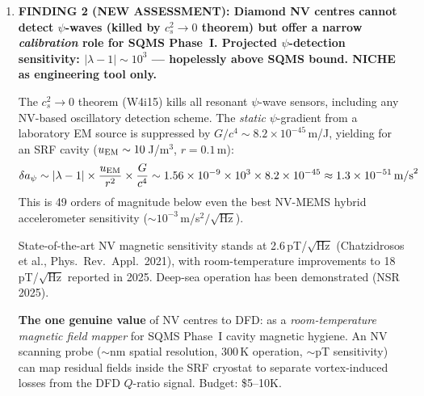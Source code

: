 \documentclass[11pt]{article}
\theoremstyle{definition}
\theoremstyle{remark}
\newcommand{\ee}[1]{\times 10^{#1}}
\newcommand{\Meff}{M_{\rm eff}}
\newcommand{\killed}[1]{\textcolor{red!70!black}{\textbf{KILLED:} #1}}
\begin{document}
\begin{tcolorbox}[colback=blue!5!white, colframe=blue!50!black,
  title=\textbf{W4i16 TOP 5 FINDINGS --- Ranked by Programme Impact}]
\begin{enumerate}
\textbf{(b) Experimental $Q$ gap.} The highest demonstrated graphene
resonator $Q$ at cryogenic temperatures is $\sim 2.5\ee{5}$ (graphene/hBN
heterostructure at $< 10$\,K; Bachtold group, Nano Lett.\ 2017). Arrays
of bare graphene drumheads achieve only $Q \sim 100$--$2400$ at room
temperature (Bunch et al., Nano Lett.\ 2011). No graphene PnC membrane
has been fabricated to date --- the theoretical predictions of $Q \sim
10^{8}$--$10^{9}$ remain entirely unrealised.

\killed{Graphene MEMS for DFD. Both the $\Meff$ deficit ($10^{6}\times$)
and the $Q$ gap ($10^{3}\times$ experimental vs theory) are independently
fatal. The materials hierarchy is unchanged: Si$_3$N$_4$ $>$ TiN $>$
crystalline Si $>$ Nb$_3$Sn. Graphene offers no path to DFD-relevant
MEMS performance.}

\item \textbf{FINDING 2 (NEW ASSESSMENT): Diamond NV centres cannot
detect $\psi$-waves (killed by $c_s^2 \to 0$ theorem) but offer a
narrow \textit{calibration} role for SQMS Phase~I. Projected
$\psi$-detection sensitivity: $|\lambda - 1| \sim 10^{3}$
--- hopelessly above SQMS bound. NICHE as engineering tool only.}

The $c_s^2 \to 0$ theorem (W4i15) kills all resonant
$\psi$-wave sensors, including any NV-based oscillatory detection
scheme. The \textit{static} $\psi$-gradient from a laboratory EM source
is suppressed by $G/c^4 \sim 8.2\ee{-45}$\,m/J, yielding for an
SRF cavity ($u_{\rm EM} \sim 10$\,J/m$^3$, $r = 0.1$\,m):
\begin{equation}
\delta a_\psi \sim |\lambda - 1| \times \frac{u_{\rm EM}}{r^2}
\times \frac{G}{c^4}
\sim 1.56\ee{-9} \times 10^3 \times 8.2\ee{-45}
\approx 1.3\ee{-51}\,\text{m/s}^2
\label{eq:nv_signal}
\end{equation}
This is 49 orders of magnitude below even the best NV-MEMS
hybrid accelerometer sensitivity ($\sim 10^{-3}$\,m/s$^2/\sqrt{\text{Hz}}$).

State-of-the-art NV magnetic sensitivity stands at 2.6\,pT/$\sqrt{\text{Hz}}$
(Chatzidrosos et al., Phys.\ Rev.\ Appl.\ 2021), with room-temperature
improvements to 18\,pT/$\sqrt{\text{Hz}}$ reported in 2025. Deep-sea
operation has been demonstrated (NSR 2025).

\textbf{The one genuine value} of NV centres to DFD: as a
\textit{room-temperature magnetic field mapper} for SQMS Phase~I
cavity magnetic hygiene. An NV scanning probe ($\sim$nm spatial
resolution, 300\,K operation, $\sim$pT sensitivity) can map residual
fields inside the SRF cryostat to separate vortex-induced losses from
the DFD $Q$-ratio signal. Budget: \$5--10K.


\end{enumerate}
\end{tcolorbox}
\end{document}
